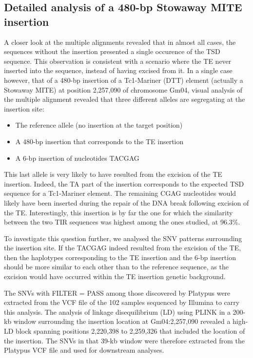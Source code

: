 \documentclass[12pt]{article}
\begin{document}
\subsection{Detailed analysis of a 480-bp Stowaway MITE insertion}

A closer look at the multiple alignments revealed that in almost all cases, the sequences without the insertion presented a single occurence of the TSD sequence.
This observation is consistent with a scenario where the TE never inserted into the sequence, instead of having excised from it.
In a single case however, that of a 480-bp insertion of a Tc1-Mariner (DTT) element (actually a Stowaway MITE) at position 2,257,090 of chromosome Gm04, visual analysis of the multiple alignment revealed that three different alleles are segregating at the insertion site:

\begin{itemize}
	\item The reference allele (no insertion at the target position)
	\item A 480-bp insertion that corresponds to the TE insertion
	\item A 6-bp insertion of nucleotides TACGAG 
\end{itemize}

This last allele is very likely to have resulted from the excision of the TE insertion.
Indeed, the TA part of the insertion corresponds to the expected TSD sequence for a Tc1-Mariner element.
The remaining CGAG nucleotides would likely have been inserted during the repair of the DNA break following excision of the TE.
Interestingly, this insertion is by far the one for which the similarity between the two TIR sequences was highest among the ones studied, at 96.3\%.

To investigate this question further, we analysed the SNV patterns surrounding the insertion site.
If the TACGAG indeed resulted from the excision of the TE, then the haplotypes corresponding to the TE insertion and the 6-bp insertion should be more similar to each other than to the reference sequence, as the excision would have occurred within the TE insertion genetic background.

The SNVs with FILTER = PASS among those discovered by Platypus \citep{platypus} were extracted from the VCF file of the 102 samples sequenced by Illumina to carry this analysis.
The analysis of linkage disequilibrium (LD) using PLINK \citep{plink} in a 200-kb window surrounding the insertion location at Gm04:2,257,090 revealed a high-LD block spanning positions 2,220,398 to 2,259,326 that included the location of the insertion.
The SNVs in that 39-kb window were therefore extracted from the Platypus VCF file and used for downstream analyses.
\end{document}
